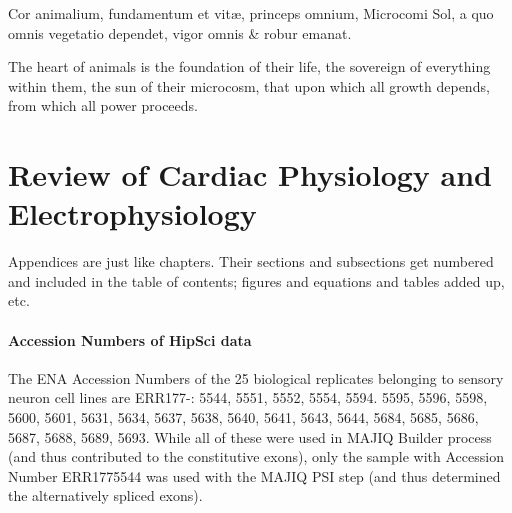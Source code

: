 \begin{savequote}[8cm]
\textlatin{Cor animalium, fundamentum e\longs t vitæ, princeps omnium, Microco\longs mi Sol, a quo omnis vegetatio dependet, vigor omnis \& robur emanat.}

The heart of animals is the foundation of their life, the sovereign of everything within them, the sun of their microcosm, that upon which all growth depends, from which all power proceeds.
\end{savequote}

\chapter{\label{app:1-cardiophys}Review of Cardiac Physiology and Electrophysiology}

\minitoc

Appendices are just like chapters.  Their sections and subsections get numbered and included in the table of contents; figures and equations and tables added up, etc.  


\subsubsection{Accession Numbers of HipSci data} \label{app:hipsci_celllines}
The ENA Accession Numbers of the 25 biological replicates belonging to sensory neuron cell lines \cite{ipscneurons} are ERR177-: 
5544, 5551, 5552, 5554, 5594. 5595, 5596, 5598, 5600, 5601, 5631, 5634, 5637, 5638, 5640, 5641, 5643, 5644, 5684, 5685, 5686, 5687, 5688, 5689, 5693.
While all of these were used in MAJIQ Builder process (and thus contributed to the constitutive exons), only the sample with Accession Number ERR1775544 was used with the MAJIQ PSI step (and thus determined the alternatively spliced exons). 

